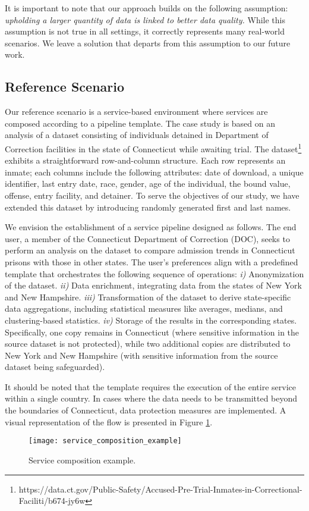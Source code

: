 It is important to note that our approach builds on the following assumption: \emph{upholding a larger quantity of data is linked to better data quality.} While this assumption is not true in all settings, it correctly represents many real-world scenarios. We leave a solution that departs from this assumption to our future work.

\subsection{Reference Scenario}\label{sec:reference}
Our reference scenario is a service-based environment where services are composed according to a pipeline template.
The case study is based on an analysis of a dataset consisting of individuals detained in Department of Correction facilities in the state of Connecticut while awaiting trial.
The dataset\footnote{https://data.ct.gov/Public-Safety/Accused-Pre-Trial-Inmates-in-Correctional-Faciliti/b674-jy6w} exhibits a straightforward row-and-column structure.
Each row represents an inmate; each columns include the following attributes: date of download, a unique identifier, last entry date, race, gender, age of the individual, the bound value, offense, entry facility, and detainer.
To serve the objectives of our study, we have extended this dataset by introducing randomly generated first and last names. 

We envision the establishment of a service pipeline designed as follows.
The end user, a member of the Connecticut Department of Correction (DOC), seeks to perform an analysis on the dataset to compare admission trends in Connecticut prisons with those in other states.
The user's preferences align with a predefined template that orchestrates the following sequence of operations: 
\emph{i)} Anonymization of the dataset.
\emph{ii)} Data enrichment, integrating data from the states of New York and New Hampshire.
\emph{iii)} Transformation of the dataset to derive state-specific data aggregations, including statistical measures like averages, medians, and clustering-based statistics.
\emph{iv)} Storage of the results in the corresponding states. Specifically, one copy remains in Connecticut (where sensitive information in the source dataset is not protected), while two additional copies are distributed to New York and New Hampshire (with sensitive information from the source dataset being safeguarded).

It should be noted that the template requires the execution of the entire service within a single country.
In cases where the data needs to be transmitted beyond the boundaries of Connecticut, data protection measures are implemented.
A visual representation of the flow is presented in Figure \ref{fig:service_composition_example}.

\begin{figure}
  \texttt{[image: service\_composition\_example]}
  \caption{Service composition example.}\label{fig:service_composition_example}

\end{figure}



